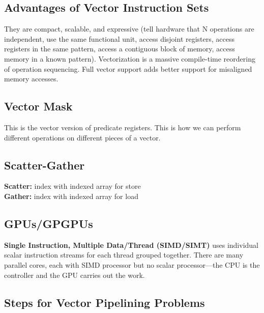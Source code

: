 \documentclass{article}
\begin{document}
\subsection{Advantages of Vector Instruction Sets}
They are compact, scalable, and expressive (tell hardware that N operations are independent, use the same functional unit, access disjoint registers, access registers in the same pattern, access a contiguous block of memory, access memory in a known pattern). Vectorization is a massive compile-time reordering of operation sequencing. Full vector support adds better support for misaligned memory accesses.

\subsection{Vector Mask}

This is the vector version of predicate registers. This is how we can perform different operations on different pieces of a vector.

\subsection{Scatter-Gather}

\textbf{Scatter:} index with indexed array for store \\
\textbf{Gather:} index with indexed array for load

\subsection{GPUs/GPGPUs}

\textbf{Single Instruction, Multiple Data/Thread (SIMD/SIMT)} uses individual scalar instruction streams for each thread grouped together. There are many parallel cores, each with SIMD processor but no scalar processor---the CPU is the controller and the GPU carries out the work.

\subsection{Steps for Vector Pipelining Problems}
\end{document}
